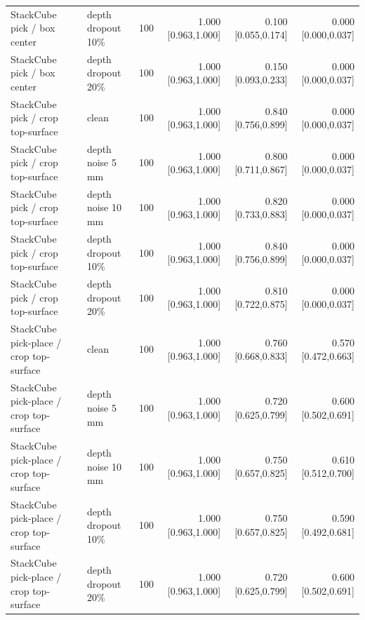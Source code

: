 \begin{table}[t]
\begin{tabular}{llrrrr}
StackCube pick / box center & depth dropout 10\% & 100 & 1.000 [0.963,1.000] & 0.100 [0.055,0.174] & 0.000 [0.000,0.037] \\
StackCube pick / box center & depth dropout 20\% & 100 & 1.000 [0.963,1.000] & 0.150 [0.093,0.233] & 0.000 [0.000,0.037] \\
\midrule
StackCube pick / crop top-surface & clean & 100 & 1.000 [0.963,1.000] & 0.840 [0.756,0.899] & 0.000 [0.000,0.037] \\
StackCube pick / crop top-surface & depth noise 5 mm & 100 & 1.000 [0.963,1.000] & 0.800 [0.711,0.867] & 0.000 [0.000,0.037] \\
StackCube pick / crop top-surface & depth noise 10 mm & 100 & 1.000 [0.963,1.000] & 0.820 [0.733,0.883] & 0.000 [0.000,0.037] \\
StackCube pick / crop top-surface & depth dropout 10\% & 100 & 1.000 [0.963,1.000] & 0.840 [0.756,0.899] & 0.000 [0.000,0.037] \\
StackCube pick / crop top-surface & depth dropout 20\% & 100 & 1.000 [0.963,1.000] & 0.810 [0.722,0.875] & 0.000 [0.000,0.037] \\
\midrule
StackCube pick-place / crop top-surface & clean & 100 & 1.000 [0.963,1.000] & 0.760 [0.668,0.833] & 0.570 [0.472,0.663] \\
StackCube pick-place / crop top-surface & depth noise 5 mm & 100 & 1.000 [0.963,1.000] & 0.720 [0.625,0.799] & 0.600 [0.502,0.691] \\
StackCube pick-place / crop top-surface & depth noise 10 mm & 100 & 1.000 [0.963,1.000] & 0.750 [0.657,0.825] & 0.610 [0.512,0.700] \\
StackCube pick-place / crop top-surface & depth dropout 10\% & 100 & 1.000 [0.963,1.000] & 0.750 [0.657,0.825] & 0.590 [0.492,0.681] \\
StackCube pick-place / crop top-surface & depth dropout 20\% & 100 & 1.000 [0.963,1.000] & 0.720 [0.625,0.799] & 0.600 [0.502,0.691] \\
\bottomrule
\end{tabular}
\end{table}
